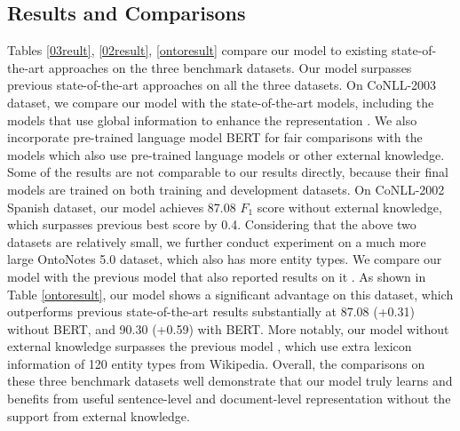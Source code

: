\documentclass[letterpaper]{article} \usepackage{aaai20}  \usepackage{times}  \usepackage{helvet} \usepackage{courier}  \usepackage[hyphens]{url}  \usepackage{graphicx} \urlstyle{rm} \def\UrlFont{\rm}  \usepackage{graphicx}  \frenchspacing  \setlength{\pdfpagewidth}{8.5in}  \setlength{\pdfpageheight}{11in}
\begin{document}
\subsection{Results and Comparisons} 
Tables \ref{03reult}, \ref{02result}, \ref{ontoresult} compare our model to existing state-of-the-art approaches on the three benchmark datasets. Our model surpasses previous state-of-the-art approaches on all the three datasets.
On CoNLL-2003 dataset, we compare our model with the state-of-the-art models, including the  models that use global information to enhance the representation \cite{yang2017neural,zhang2018sentence,qian2019graphie,liu2019gcdt}. 
We also incorporate pre-trained language model BERT \cite{devlin2018bert} for fair comparisons with the models which also use pre-trained language models or other external knowledge.
Some of the results \cite{akbik2018contextual,akbik2018contextual} are not comparable to our results directly, because their final models are trained on both training and development datasets.
On CoNLL-2002 Spanish dataset, our model achieves 87.08 $F_1$ score without external knowledge, which surpasses previous best score by 0.4.
Considering that the above two datasets are relatively small, we further conduct experiment on a much more large OntoNotes 5.0 dataset, which also has more entity types. 
We compare our model with the previous model that also reported results on it \cite{chiu2016named,shen2017deep,ghaddar2018robust}.
 As shown in Table \ref{ontoresult}, our model shows a significant advantage on this dataset, which outperforms previous state-of-the-art results substantially at 87.08 (+0.31) without BERT,  and 90.30 (+0.59) with BERT. More notably, our model without external knowledge surpasses the previous model \cite{ghaddar2018robust}, which use extra lexicon information of 120 entity types from Wikipedia.
 Overall, the comparisons on these three benchmark datasets well demonstrate that our model truly learns and benefits from useful sentence-level and document-level representation without the support from external knowledge.
 
 \begin{table}[t!] 
\centering
{}
\caption{Ablation study on the three benchmark datasets.}
\label{ablation}
\end{table}  
\end{document}
